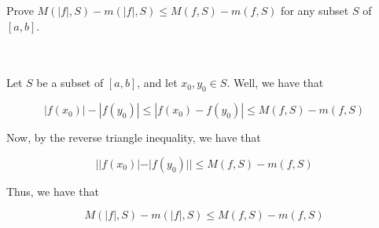 Prove $M(|f|,S)-m(|f|,S)\leq M(f,S)-m(f,S)$ for any subset $S$ of $[a,b]$.\\\\

\begin{solution}\renewcommand{\qedsymbol}{}\ \\
    Let $S$ be a subset of $[a,b]$, and let $x_0,y_0\in S$. Well, we have that
    
    $$|f(x_0)|-|f(y_0)|\leq|f(x_0)-f(y_0)|\leq M(f,S)-m(f,S)$$
    
    Now, by the reverse triangle inequality, we have that
    
    $$||f(x_0)|-|f(y_0)||\leq M(f,S)-m(f,S)$$
    
    Thus, we have that

    $$M(|f|,S)-m(|f|,S)\leq M(f,S)-m(f,S)$$

\end{solution}